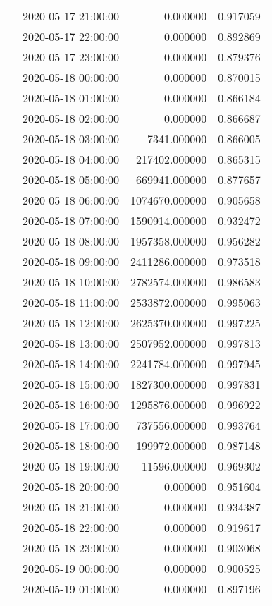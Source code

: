 \begin{tabular}{llrr}
 & 2020-05-17 21:00:00 & 0.000000 & 0.917059 \\
 & 2020-05-17 22:00:00 & 0.000000 & 0.892869 \\
 & 2020-05-17 23:00:00 & 0.000000 & 0.879376 \\
 & 2020-05-18 00:00:00 & 0.000000 & 0.870015 \\
 & 2020-05-18 01:00:00 & 0.000000 & 0.866184 \\
 & 2020-05-18 02:00:00 & 0.000000 & 0.866687 \\
 & 2020-05-18 03:00:00 & 7341.000000 & 0.866005 \\
 & 2020-05-18 04:00:00 & 217402.000000 & 0.865315 \\
 & 2020-05-18 05:00:00 & 669941.000000 & 0.877657 \\
 & 2020-05-18 06:00:00 & 1074670.000000 & 0.905658 \\
 & 2020-05-18 07:00:00 & 1590914.000000 & 0.932472 \\
 & 2020-05-18 08:00:00 & 1957358.000000 & 0.956282 \\
 & 2020-05-18 09:00:00 & 2411286.000000 & 0.973518 \\
 & 2020-05-18 10:00:00 & 2782574.000000 & 0.986583 \\
 & 2020-05-18 11:00:00 & 2533872.000000 & 0.995063 \\
 & 2020-05-18 12:00:00 & 2625370.000000 & 0.997225 \\
 & 2020-05-18 13:00:00 & 2507952.000000 & 0.997813 \\
 & 2020-05-18 14:00:00 & 2241784.000000 & 0.997945 \\
 & 2020-05-18 15:00:00 & 1827300.000000 & 0.997831 \\
 & 2020-05-18 16:00:00 & 1295876.000000 & 0.996922 \\
 & 2020-05-18 17:00:00 & 737556.000000 & 0.993764 \\
 & 2020-05-18 18:00:00 & 199972.000000 & 0.987148 \\
 & 2020-05-18 19:00:00 & 11596.000000 & 0.969302 \\
 & 2020-05-18 20:00:00 & 0.000000 & 0.951604 \\
 & 2020-05-18 21:00:00 & 0.000000 & 0.934387 \\
 & 2020-05-18 22:00:00 & 0.000000 & 0.919617 \\
 & 2020-05-18 23:00:00 & 0.000000 & 0.903068 \\
 & 2020-05-19 00:00:00 & 0.000000 & 0.900525 \\
 & 2020-05-19 01:00:00 & 0.000000 & 0.897196 \\

\end{tabular}
